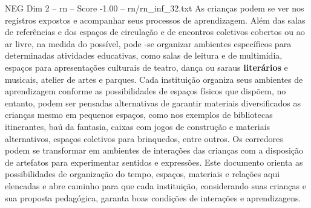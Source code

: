 \begin{textsample}{NEG Dim 2 – rn – Score -1.00 – rn/rn\_inf\_32.txt}
As crianças podem se ver nos registros expostos e acompanhar seus processos de aprendizagem.
Além das salas de referências e dos espaços de circulação e de encontros coletivos cobertos ou ao ar livre, na medida do possível, pode -se organizar ambientes específicos para determinadas atividades educativas, como salas de leitura e de multimídia, espaços para apresentações culturais de teatro, dança ou saraus \textbf{literários} e musicais, atelier de artes e parques.
Cada instituição organiza seus ambientes de aprendizagem conforme as possibilidades de espaços físicos que dispõem, no entanto, podem ser pensadas alternativas de garantir materiais diversificados as crianças mesmo em pequenos espaços, como nos exemplos de bibliotecas itinerantes, baú da fantasia, caixas com jogos de construção e materiais alternativos, espaços coletivos para brinquedos, entre outros.
Os corredores podem se transformar em ambientes de interações das crianças com a disposição de artefatos para experimentar sentidos e expressões.
Este documento orienta as possibilidades de organização do tempo, espaços, materiais e relações aqui elencadas e abre caminho para que cada instituição, considerando suas crianças e sua proposta pedagógica, garanta boas condições de interações e aprendizagens.

\end{textsample}
